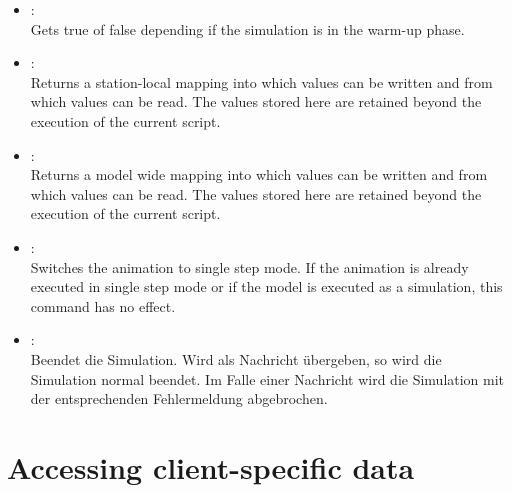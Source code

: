 \begin{itemize}
\item
{}:\\
Gets true of false depending if the simulation is in the warm-up phase.

\item
{}:\\
Returns a station-local mapping into which values can be written and from which values can be read.
The values stored here are retained beyond the execution of the current script.  

\item
{}:\\
Returns a model wide mapping into which values can be written and from which values can be read.
The values stored here are retained beyond the execution of the current script.

\item
{}:\\
Switches the animation to single step mode. If the animation is already executed in
single step mode or if the model is executed as a simulation, this command has no effect.

\item
{}:\\
Beendet die Simulation. Wird als Nachricht  übergeben, so wird die Simulation normal
beendet. Im Falle einer Nachricht wird die Simulation mit der entsprechenden Fehlermeldung abgebrochen.

\end{itemize}

\section{Accessing client-specific data}

